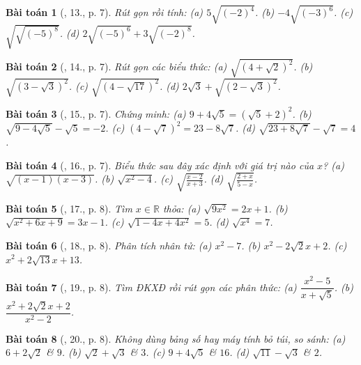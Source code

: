 \documentclass{article}
\newtheorem{baitoan}{Bài toán}
\begin{document}
\begin{baitoan}[\cite{SBT_Toan_9_tap_1}, 13., p. 7]
	Rút gọn rồi tính: (a) $5\sqrt{(-2)^4}$. (b) $-4\sqrt{(-3)^6}$. (c) $\sqrt{\sqrt{(-5)^8}}$. (d) $2\sqrt{(-5)^6} + 3\sqrt{(-2)^8}$.
\end{baitoan}

\begin{baitoan}[\cite{SBT_Toan_9_tap_1}, 14., p. 7]
	Rút gọn các biểu thức: (a) $\sqrt{(4 + \sqrt{2})^2}$. (b) $\sqrt{(3 - \sqrt{3})^2}$. (c) $\sqrt{(4 - \sqrt{17})^2}$. (d) $2\sqrt{3} + \sqrt{(2 - \sqrt{3})^2}$.
\end{baitoan}

\begin{baitoan}[\cite{SBT_Toan_9_tap_1}, 15., p. 7]
	Chứng minh: (a) $9 + 4\sqrt{5} = (\sqrt{5} + 2)^2$. (b) $\sqrt{9 - 4\sqrt{5}} - \sqrt{5} = -2$. (c) $(4 - \sqrt{7})^2 = 23 - 8\sqrt{7}$. (d) $\sqrt{23 + 8\sqrt{7}} - \sqrt{7} = 4$.
\end{baitoan}

\begin{baitoan}[\cite{SBT_Toan_9_tap_1}, 16., p. 7]
	Biểu thức sau đây xác định với giá trị nào của $x$? (a) $\sqrt{(x - 1)(x - 3)}$. (b) $\sqrt{x^2 - 4}$. (c) $\sqrt{\frac{x - 2}{x + 3}}$. (d) $\sqrt{\frac{2 + x}{5 - x}}$.
\end{baitoan}

\begin{baitoan}[\cite{SBT_Toan_9_tap_1}, 17., p. 8]
	Tìm $x\in\mathbb{R}$ thỏa: (a) $\sqrt{9x^2} = 2x + 1$. (b) $\sqrt{x^2 + 6x + 9} = 3x - 1$. (c) $\sqrt{1 - 4x + 4x^2} = 5$. (d) $\sqrt{x^4} = 7$.
\end{baitoan}

\begin{baitoan}[\cite{SBT_Toan_9_tap_1}, 18., p. 8]
	Phân tích nhân tử: (a) $x^2 - 7$. (b) $x^2  - 2\sqrt{2}x + 2$. (c) $x^2 + 2\sqrt{13}x + 13$.
\end{baitoan}

\begin{baitoan}[\cite{SBT_Toan_9_tap_1}, 19., p. 8]
	Tìm ĐKXĐ rồi rút gọn các phân thức: (a) $\dfrac{x^2 - 5}{x + \sqrt{5}}$. (b) $\dfrac{x^2 + 2\sqrt{2}x + 2}{x^2 - 2}$.
\end{baitoan}

\begin{baitoan}[\cite{SBT_Toan_9_tap_1}, 20., p. 8]
	Không dùng bảng số hay máy tính bỏ túi, so sánh: (a) $6 + 2\sqrt{2}$ \& $9$. (b) $\sqrt{2} + \sqrt{3}$ \& $3$. (c) $9 + 4\sqrt{5}$ \& $16$. (d) $\sqrt{11} - \sqrt{3}$ \& $2$.
\end{baitoan}
\end{document}
